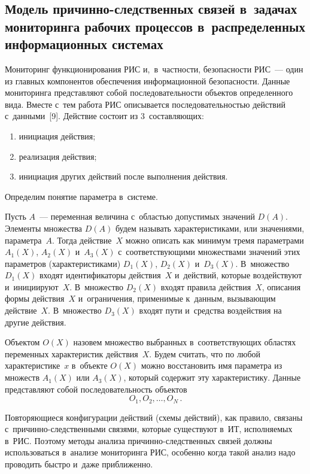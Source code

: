 \begin{multicols}{2}
  
  \section{Модель причинно-следственных связей в~задачах 
мониторинга рабочих процессов в~распределенных информационных системах}
  
  Мониторинг функционирования РИС и,~в~частности, безопасности РИС~--- 
один из главных компонентов обеспечения информационной безопасности. 
Данные мониторинга представляют собой последовательности объектов 
определенного вида. Вместе с~тем работа РИС описывается последовательностью 
действий с~данными~[9]. Действие состоит из 3~составляющих:
  \begin{enumerate}[(1)]
\item инициация действия;
\item реализация действия; 
\item инициация других действий после выполнения действия. 
\end{enumerate}
  
  Определим понятие параметра в~системе. 
  
  Пусть $A$~--- переменная величина 
с~об\-ластью допустимых значений $D(A)$. Элементы множества $D(A)$ будем 
называть характеристиками, или значениями, параметра~$A$. Тогда 
действие~$X$ можно описать как минимум тремя параметрами $A_1(X)$, $A_2(X)$ 
и~$A_3(X)$ с~соответствующими множествами значений этих параметров 
(характеристиками) $D_1(X)$, $D_2(X)$ и~$D_3(X)$. В~множество $D_1(X)$ входят 
идентификаторы действия~$X$ и~действий, которые воздействуют 
и~инициируют~$X$. В~множество $D_2(X)$ входят правила действия~$X$, 
описания формы действия~$X$ и~ограничения, применимые к~данным, 
вызывающим действие~$X$. В~множество $D_3(X)$ входят пути и~средства 
воздействия на другие действия.
  
  Объектом $O(X)$ назовем множество выбранных в~соответствующих областях 
переменных характеристик действия~$X$. Будем считать, что по любой 
характеристике~$x$ в~объекте $O(X)$ можно восстановить имя параметра из 
множеств $A_1(X)$ или $A_3(X)$, который содержит эту характеристику. 
Данные представляют собой последовательность объектов
  \begin{equation}
  O_1, O_2, \ldots , O_N\,.
  \label{e1-gr}
  \end{equation}
  
  Повторяющиеся конфигурации действий (схемы действий), как правило, 
связаны с~при\-чин\-но-след\-ст\-вен\-ны\-ми связями, которые существуют в~ИТ, 
исполняемых в~РИС. Поэтому методы анализа при\-чин\-но-след\-ст\-вен\-ных 
связей должны использоваться в~анализе мониторинга РИС, особенно когда такой 
анализ надо проводить быстро и~даже приближенно.
  

\end{multicols}
